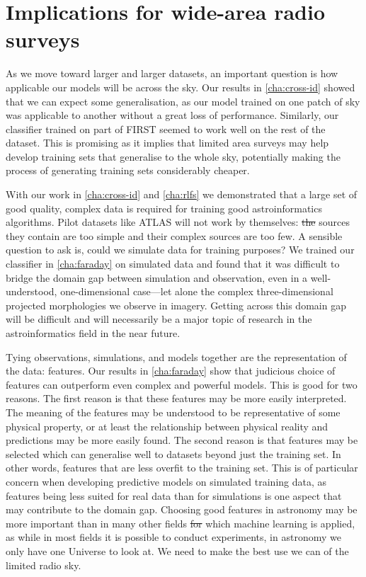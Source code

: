 \documentclass[11pt, a4paper]{book}
\providecommand{\DIFaddtex}[1]{{\protect\color{blue}\uwave{#1}}} %
\providecommand{\DIFdeltex}[1]{{\protect\color{red}\sout{#1}}}                      %
\providecommand{\DIFaddbegin}{} %
\providecommand{\DIFaddend}{} %
\providecommand{\DIFdelbegin}{} %
\providecommand{\DIFdelend}{} %
\providecommand{\DIFadd}[1]{\texorpdfstring{\DIFaddtex{#1}}{#1}} %
\providecommand{\DIFdel}[1]{\texorpdfstring{\DIFdeltex{#1}}{}} %
\newcommand{\DIFscaledelfig}{0.5}
\newlength{\DIFdelgraphicswidth} %
\newlength{\DIFdelgraphicsheight} %
\newcommand{\DIFaddincludegraphics}[2][]{{\color{blue}\fbox{\DIFOincludegraphics[#1]{#2}}}} %
\newcommand{\DIFdelincludegraphics}[2][]{%
\sbox{\DIFdelgraphicsbox}{\DIFOincludegraphics[#1]{#2}}%
\settoboxwidth{\DIFdelgraphicswidth}{\DIFdelgraphicsbox} %
\settoboxtotalheight{\DIFdelgraphicsheight}{\DIFdelgraphicsbox} %
\scalebox{\DIFscaledelfig}{%
\parbox[b]{\DIFdelgraphicswidth}{\usebox{\DIFdelgraphicsbox}\\[-\baselineskip] \rule{\DIFdelgraphicswidth}{0em}}\llap{\resizebox{\DIFdelgraphicswidth}{\DIFdelgraphicsheight}{%
\setlength{\unitlength}{\DIFdelgraphicswidth}%
\begin{picture}(1,1)%
\thicklines\linethickness{2pt} %
{\color[rgb]{1,0,0}\put(0,0){\framebox(1,1){}}}%
{\color[rgb]{1,0,0}\put(0,0){\line( 1,1){1}}}%
{\color[rgb]{1,0,0}\put(0,1){\line(1,-1){1}}}%
\end{picture}%
}\hspace*{3pt}}} %
} %
\DeclareRobustCommand{\DIFaddbegin}{\DIFOaddbegin \let\includegraphics\DIFaddincludegraphics} %
\DeclareRobustCommand{\DIFaddend}{\DIFOaddend \let\includegraphics\DIFOincludegraphics} %
\DeclareRobustCommand{\DIFdelbegin}{\DIFOdelbegin \let\includegraphics\DIFdelincludegraphics} %
\DeclareRobustCommand{\DIFdelend}{\DIFOaddend \let\includegraphics\DIFOincludegraphics} %
\begin{document}
\section{Implications for wide-area radio surveys}
\label{sec:implications-wide-area-radio-surveys}

    As we move toward larger and larger datasets, an important question is how applicable our models will be across the sky. Our results in \autoref{cha:cross-id} showed that we can expect some generalisation, as our model trained on one patch of sky was applicable to another without a great loss of performance. Similarly, our classifier trained on part of FIRST seemed to work well on the rest of the dataset. This is promising as it implies that limited area surveys may help develop training sets that generalise to the whole sky, potentially making the process of generating training sets considerably cheaper.

    With our work in \autoref{cha:cross-id} and \ref{cha:rlfs} we demonstrated that a large set of good quality, complex data is required for training good astroinformatics algorithms. Pilot datasets like ATLAS will not work by themselves: \DIFdelbegin \DIFdel{the }\DIFdelend \DIFaddbegin \DIFadd{The }\DIFaddend sources they contain are too simple and their complex sources are too few. A sensible question to ask is, could we simulate data for training purposes? We trained our classifier in \autoref{cha:faraday} on simulated data and found that it was difficult to bridge the domain gap between simulation and observation, even in a well-understood, one-dimensional case---let alone the complex three-dimensional projected morphologies we observe in imagery. Getting across this domain gap will be difficult and will necessarily be a major topic of research in the astroinformatics field in the near future.

    Tying observations, simulations, and models together are the representation of the data: features. Our results in \autoref{cha:faraday} show that judicious choice of features can outperform even complex and powerful models. This is good for two reasons. The first reason is that these features may be more easily interpreted. The meaning of the features may be understood to be representative of some physical property, or at least the relationship between physical reality and predictions may be more easily found. The second reason is that features may be selected which can generalise well to datasets beyond just the training set. In other words, features that are less overfit to the training set. This is of particular concern when developing predictive models on simulated training data, as features being less suited for real data than for simulations is one aspect that may contribute to the domain gap. Choosing good features in astronomy may be more important than in many other fields \DIFdelbegin \DIFdel{for }\DIFdelend \DIFaddbegin \DIFadd{to }\DIFaddend which machine learning is applied, as while in most fields it is possible to conduct experiments, in astronomy we only have one Universe to look at. We need to make the best use we can of the limited radio sky.
\end{document}
